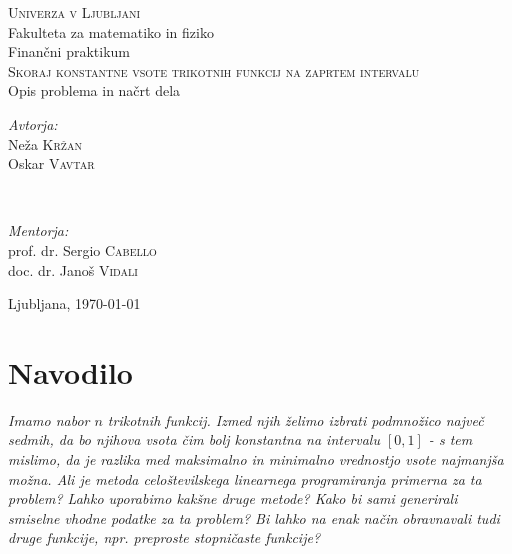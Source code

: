 \documentclass[11pt]{article}
\theoremstyle{definition}
\newcommand{\1}{\mathbbm{1}}
\begin{document}
\begin{titlepage} 

	\center 
	
	\textsc{\LARGE Univerza v Ljubljani}\\[0.5cm] 
	{\Large Fakulteta za matematiko in fiziko}\\[3cm] 
	
	{\large Finančni praktikum}\\[1.0cm]
	
	{\huge \textsc{Skoraj konstantne vsote trikotnih funkcij na zaprtem intervalu}}\\[1.0cm]
	
	{\large Opis problema in načrt dela}\\[3.0cm]
	
	\begin{minipage}{0.4\textwidth}
		\begin{flushleft}
			\large
			\textit{Avtorja:}\\
			Neža \textsc{Kržan} \\
			Oskar \textsc{Vavtar} 
		\end{flushleft}
	\end{minipage}
	~
	\begin{minipage}{0.4\textwidth}
		\begin{flushright}
			\large
			\textit{Mentorja:}\\
			prof. dr. Sergio \textsc{Cabello} \\
			doc. dr. Janoš \textsc{Vidali}
		\end{flushright}
	\end{minipage}
	
	\vfill\vfill\vfill 
	
	{\large{Ljubljana, \today}} 
	 
	\vfill 
	
\end{titlepage}

\section{Navodilo}
\vspace{0.5cm}

\textit{Imamo nabor $n$ trikotnih funkcij. Izmed njih želimo izbrati podmnožico največ sedmih, da bo njihova vsota čim bolj konstantna na intervalu $[0,1]$ - s tem mislimo, da je razlika med maksimalno in minimalno vrednostjo vsote najmanjša možna. Ali je metoda celoštevilskega linearnega programiranja primerna za ta problem? Lahko uporabimo kakšne druge metode? Kako bi sami generirali smiselne vhodne podatke za ta problem? Bi lahko na enak način obravnavali tudi druge funkcije, npr. preproste stopničaste funkcije?}
\vspace{0.5cm}
\end{document}
